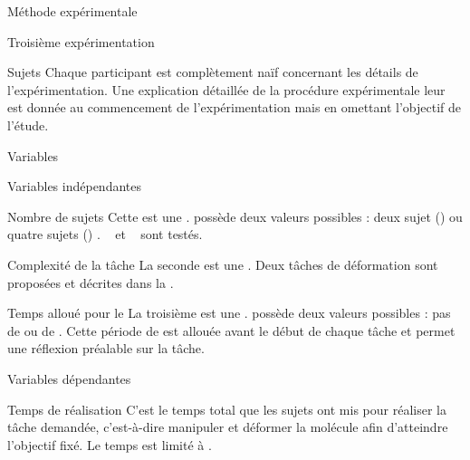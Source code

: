 \documentclass[myfrancais]{mythesis}
\begin{document}
\begin{mychapter}{Méthode expérimentale}
\begin{mysection}{Troisième expérimentation}
\begin{mysubsection}{Sujets}
				Chaque participant est complètement naïf concernant les détails de l'expérimentation.
				Une explication détaillée de la procédure expérimentale leur est donnée au commencement de l'expérimentation mais en omettant l'objectif de l'étude.
			\end{mysubsection}
			\begin{mysubsection}{Variables}
				\begin{mysubsubsection}{Variables indépendantes}
					\begin{myparagraph}{ Nombre de sujets}
						Cette  est une .
						 possède deux valeurs possibles : \og deux sujet (\mycf {}) \fg ou \og quatre sujets (\mycf {}) \fg.
						~ et ~ sont testés.
					\end{myparagraph}
					\begin{myparagraph}{ Complexité de la tâche}
						La seconde  est une .
						Deux tâches de déformation sont proposées et décrites dans la .
					\end{myparagraph}
					\begin{myparagraph}{ Temps alloué pour le \mybrainstorming}
						La troisième  est une .
						 possède deux valeurs possibles : \og pas de \mybrainstorming \fg ou \og {} de \mybrainstorming \fg.
						Cette période de \mybrainstorming est allouée avant le début de chaque tâche et permet une réflexion préalable sur la tâche.
					\end{myparagraph}
				\end{mysubsubsection}
				\begin{mysubsubsection}{Variables dépendantes}
					\begin{myparagraph}{ Temps de réalisation}
						C'est le temps total que les sujets ont mis pour réaliser la tâche demandée, c'est-à-dire manipuler et déformer la molécule afin d'atteindre l'objectif fixé.
						Le temps est limité à .
					\end{myparagraph}

\end{mysubsubsection}
\end{mysubsection}
\end{mysection}
\end{mychapter}
\end{document}

